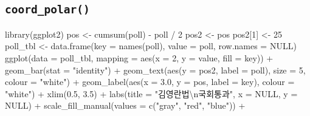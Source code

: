 \documentclass[
]{article}
\newenvironment{Shaded}{\begin{snugshade}}{\end{snugshade}}
\newcommand{\AttributeTok}[1]{\textcolor[rgb]{0.77,0.63,0.00}{#1}}
\newcommand{\ConstantTok}[1]{\textcolor[rgb]{0.00,0.00,0.00}{#1}}
\newcommand{\DecValTok}[1]{\textcolor[rgb]{0.00,0.00,0.81}{#1}}
\newcommand{\FloatTok}[1]{\textcolor[rgb]{0.00,0.00,0.81}{#1}}
\newcommand{\FunctionTok}[1]{\textcolor[rgb]{0.00,0.00,0.00}{#1}}
\newcommand{\NormalTok}[1]{#1}
\newcommand{\OtherTok}[1]{\textcolor[rgb]{0.56,0.35,0.01}{#1}}
\newcommand{\SpecialCharTok}[1]{\textcolor[rgb]{0.00,0.00,0.00}{#1}}
\newcommand{\StringTok}[1]{\textcolor[rgb]{0.31,0.60,0.02}{#1}}
\begin{document}
\hypertarget{coord_polar}{%
\subsection{\texorpdfstring{\texttt{coord\_polar()}}{coord\_polar()}}\label{coord_polar}}

\begin{Shaded}
\begin{Highlighting}[]
\FunctionTok{library}\NormalTok{(ggplot2)}
\NormalTok{pos }\OtherTok{\textless{}{-}} \FunctionTok{cumsum}\NormalTok{(poll) }\SpecialCharTok{{-}}\NormalTok{ poll }\SpecialCharTok{/} \DecValTok{2}
\NormalTok{pos2 }\OtherTok{\textless{}{-}}\NormalTok{ pos}
\NormalTok{pos2[}\DecValTok{1}\NormalTok{] }\OtherTok{\textless{}{-}} \DecValTok{25}
\NormalTok{poll\_tbl }\OtherTok{\textless{}{-}} \FunctionTok{data.frame}\NormalTok{(}\AttributeTok{key =} \FunctionTok{names}\NormalTok{(poll), }
                       \AttributeTok{value =}\NormalTok{ poll, }
                       \AttributeTok{row.names =} \ConstantTok{NULL}\NormalTok{)}
\FunctionTok{ggplot}\NormalTok{(}\AttributeTok{data =}\NormalTok{ poll\_tbl, }
       \AttributeTok{mapping =} \FunctionTok{aes}\NormalTok{(}\AttributeTok{x =} \DecValTok{2}\NormalTok{, }\AttributeTok{y =}\NormalTok{ value, }\AttributeTok{fill =}\NormalTok{ key)) }\SpecialCharTok{+}
  \FunctionTok{geom\_bar}\NormalTok{(}\AttributeTok{stat =} \StringTok{"identity"}\NormalTok{) }\SpecialCharTok{+}
  \FunctionTok{geom\_text}\NormalTok{(}\FunctionTok{aes}\NormalTok{(}\AttributeTok{y =}\NormalTok{ pos2, }\AttributeTok{label =}\NormalTok{ poll), }
            \AttributeTok{size =} \DecValTok{5}\NormalTok{, }
            \AttributeTok{colour =} \StringTok{"white"}\NormalTok{) }\SpecialCharTok{+}
  \FunctionTok{geom\_label}\NormalTok{(}\FunctionTok{aes}\NormalTok{(}\AttributeTok{x =} \FloatTok{3.0}\NormalTok{, }\AttributeTok{y =}\NormalTok{ pos, }\AttributeTok{label =}\NormalTok{ key), }
             \AttributeTok{colour =} \StringTok{"white"}\NormalTok{) }\SpecialCharTok{+}
  \FunctionTok{xlim}\NormalTok{(}\FloatTok{0.5}\NormalTok{, }\FloatTok{3.5}\NormalTok{) }\SpecialCharTok{+}
  \FunctionTok{labs}\NormalTok{(}\AttributeTok{title =} \StringTok{"김영란법}\SpecialCharTok{\textbackslash{}n}\StringTok{국회통과"}\NormalTok{, }\AttributeTok{x =} \ConstantTok{NULL}\NormalTok{, }\AttributeTok{y =} \ConstantTok{NULL}\NormalTok{) }\SpecialCharTok{+}
  \FunctionTok{scale\_fill\_manual}\NormalTok{(}\AttributeTok{values =} \FunctionTok{c}\NormalTok{(}\StringTok{"gray"}\NormalTok{, }\StringTok{"red"}\NormalTok{, }\StringTok{"blue"}\NormalTok{)) }\SpecialCharTok{+}

\end{Highlighting}
\end{Shaded}
\end{document}

